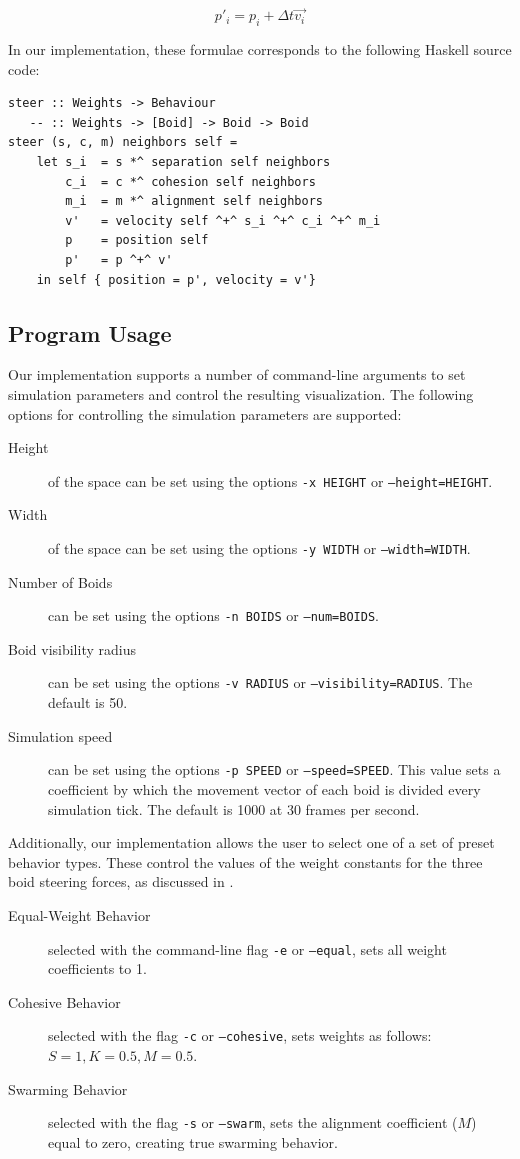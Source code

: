 \[ p\prime_i = p_i + \Delta t\vec{v_i}\]

In our implementation, these formulae corresponds to the following Haskell source code:

\begin{verbatim}
steer :: Weights -> Behaviour
   -- :: Weights -> [Boid] -> Boid -> Boid
steer (s, c, m) neighbors self =
    let s_i  = s *^ separation self neighbors
        c_i  = c *^ cohesion self neighbors
        m_i  = m *^ alignment self neighbors
        v'   = velocity self ^+^ s_i ^+^ c_i ^+^ m_i
        p    = position self
        p'   = p ^+^ v'
    in self { position = p', velocity = v'}
\end{verbatim}

\subsection{Program Usage}

Our implementation supports a number of command-line arguments to set simulation parameters and control the resulting visualization. The following options for controlling the simulation parameters are supported:

\begin{description}
    \item[Height] of the space can be set using the options \texttt{-x HEIGHT} or \texttt{--height=HEIGHT}. 
    \item[Width] of the space can be set using the options \texttt{-y WIDTH} or \texttt{--width=WIDTH}.
    \item[Number of Boids] can be  set using the options \texttt{-n BOIDS} or \texttt{--num=BOIDS}.
    \item[Boid visibility radius] can be set using the options \texttt{-v RADIUS} or \texttt{--visibility=RADIUS}. The default is 50.
    \item[Simulation speed] can be set using the options \texttt{-p SPEED} or \texttt{--speed=SPEED}. This value sets a coefficient by which the movement vector of each boid is divided every simulation tick. The default is 1000 at 30 frames per second.
\end{description}

Additionally, our implementation allows the user to select one of a set of preset behavior types. These control the values of the weight constants for the three boid steering forces, as discussed in .

\begin{description}
    \item[Equal-Weight Behavior] selected with the command-line flag \texttt{-e} or \texttt{--equal}, sets all weight coefficients to 1.
    \item[Cohesive Behavior] selected with the flag \texttt{-c} or \texttt{--cohesive}, sets weights as follows: $S = 1, K = 0.5, M = 0.5$.
    \item[Swarming Behavior] selected with the flag \texttt{-s} or \texttt{--swarm}, sets the alignment coefficient ($M$) equal to zero, creating true swarming behavior.
\end{description}

